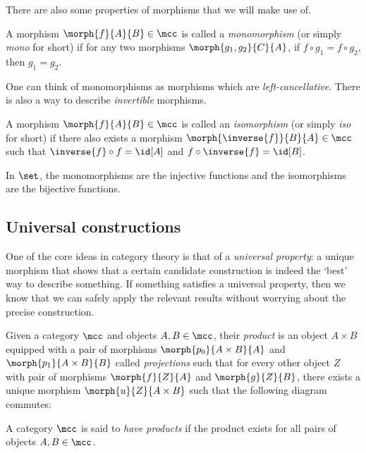 There are also some properties of morphisms that we will make use of.

\begin{definition}[Monomorphism]
    A morphism \(\morph{f}{A}{B} \in \mcc\) is called a \emph{monomorphism} (or
    simply \emph{mono} for short) if for any two morphisms
    \(\morph{g_1,g_2}{C}{A}\), if \(f \circ g_1 = f \circ g_2\), then
    \(g_1 = g_2\).
\end{definition}

One can think of monomorphisms as morphisms which are \emph{left-cancellative}.
There is also a way to describe \emph{invertible} morphisms.

\begin{definition}[Isomorphism]
    A morphism \(\morph{f}{A}{B} \in \mcc\) is called an \emph{isomorphism} (or
    simply \emph{iso} for short) if there also exists a morphism \(
    \morph{\inverse{f}}{B}{A} \in \mcc
    \) such that \(
    \inverse{f} \circ f = \id[A]
    \) and \(
    f \circ \inverse{f} = \id[B]
    \).
\end{definition}

\begin{example}
    In \(\set\), the monomorphisms are the injective functions and the
    isomorphisms are the bijective functions.
\end{example}

\subsection{Universal constructions}

One of the core ideas in category theory is that of a \emph{universal property}:
a unique morphism that shows that a certain candidate construction is indeed the
`best' way to describe something.
If something satisfies a universal property, then we know that we can safely
apply the relevant results without worrying about the precise construction.

\begin{definition}[Product]
    Given a category \(\mcc\) and objects \(A,B \in \mcc\), their \emph{product}
    is an object \(A \times B\) equipped with a pair of morphisms
    \(\morph{p_0}{A \times B}{A}\) and \(\morph{p_1}{A \times B}{B}\) called
    \emph{projections} such that for every other object \(Z\) with pair of
    morphisms \(\morph{f}{Z}{A}\) and \(\morph{g}{Z}{B}\), there exists a unique
    morphism \(\morph{u}{Z}{A \times B}\) such that the following diagram
    commutes:
    \begin{center}
        
    \end{center}
    A category \(\mcc\) is said to \emph{have products} if the product exists
    for all pairs of objects \(A,B \in \mcc\).
\end{definition}

